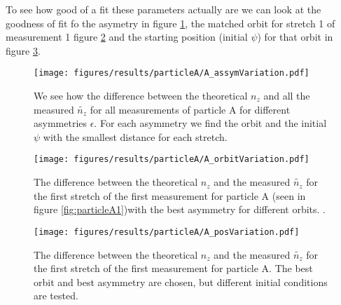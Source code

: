  To see how good of a fit these parameters actually are we can look at the goodness of fit fo the asymetry in figure \ref{fig:asymVariation}, the matched orbit for stretch 1 of measurement 1 figure \ref{fig:orbitVariation} and the starting position (initial $\psi$) for that orbit in figure \ref{fig:initVariation}.  
 
 \begin{figure}[H]
 \begin{center}
 \texttt{[image: figures/results/particleA/A\_assymVariation.pdf]}
 \end{center}
 \caption{We see how the difference between the theoretical $n_z$ and all the measured  $\widetilde{n_z}$ for all measurements of particle A for different asymmetries $\epsilon$. For each asymmetry we find the orbit and the initial $\psi$ with the smallest distance for each stretch.}
 \label{fig:asymVariation}
 \end{figure}
 
 \begin{figure}[H]
 \begin{center}
 \texttt{[image: figures/results/particleA/A\_orbitVariation.pdf]}
 \end{center}
 \caption{The difference between the theoretical $n_z$ and the measured $\widetilde{n_z}$ for the first stretch of the first measurement for particle A (seen in figure \ref{fig:particleA1})with the best asymmetry for different orbits. .}
 \label{fig:orbitVariation}
 \end{figure}
 
 
 \begin{figure}[H]
 \begin{center}
 \texttt{[image: figures/results/particleA/A\_posVariation.pdf]}
 \end{center}
 \caption{The difference between the theoretical $n_z$ and the measured $\widetilde{n_z}$ for the first stretch of the first measurement for particle A. The best orbit and best asymmetry are chosen, but different initial conditions are tested. }
 \label{fig:initVariation}
 \end{figure}
 
